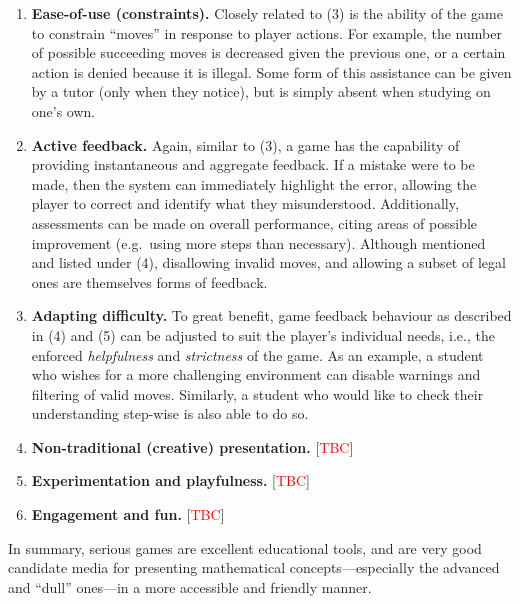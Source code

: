 \documentclass[a4paper]{article}
\newcommand{\comment}[1]{[\textcolor{red}{#1}]} %
\begin{document}
\begin{enumerate}
  \item \textbf{Ease-of-use (constraints).} Closely related to (3) is the ability of the game to constrain ``moves'' in response to player actions. For example, the number of possible succeeding moves is decreased given the previous one, or a certain action is denied because it is illegal. Some form of this assistance can be given by a tutor (only when they notice), but is simply absent when studying on one's own.
  \item \textbf{Active feedback.} Again, similar to (3), a game has the capability of providing instantaneous and aggregate feedback. If a mistake were to be made, then the system can immediately highlight the error, allowing the player to correct and identify what they misunderstood. Additionally, assessments can be made on overall performance, citing areas of possible improvement (e.g.\ using more steps than necessary). Although mentioned and listed under (4), disallowing invalid moves, and allowing a subset of legal ones are themselves forms of feedback.
  \item \textbf{Adapting difficulty.} To great benefit, game feedback behaviour as described in (4) and (5) can be adjusted to suit the player's individual needs, i.e., the enforced \emph{helpfulness} and \emph{strictness} of the game. As an example, a student who wishes for a more challenging environment can disable warnings and filtering of valid moves. Similarly, a student who would like to check their understanding step-wise is also able to do so.
  \item \textbf{Non-traditional (creative) presentation.} \comment{TBC}
  \item \textbf{Experimentation and playfulness.} \comment{TBC} %
  \item \textbf{Engagement and fun.} \comment{TBC}
\end{enumerate}


In summary, serious games are excellent educational tools, and are very good candidate media for presenting mathematical concepts---especially the advanced and ``dull'' ones---in a more accessible and friendly manner.
\end{document}
